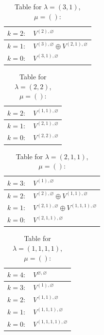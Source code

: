 \documentclass[a4paper,12pt]{article}
\begin{document}
\renewcommand{\arraystretch}{1.6} 
\begin{table}[H]
\centering
\caption{Table for $\lambda = (3, 1)$, $\mu = ()$:}
\begin{tabular}{|>{\centering\arraybackslash}p{15cm}|}
\hline
 $k = 2: \quad V^{(2), \varnothing} $ \\ \hline
 $k = 1: \quad V^{(3), \varnothing} \oplus V^{(2, 1), \varnothing} $ \\ \hline
 $k = 0: \quad V^{(3, 1), \varnothing} $ \\ \hline
\end{tabular}
\end{table}

\renewcommand{\arraystretch}{1.6} 
\begin{table}[H]
\centering
\caption{Table for $\lambda = (2, 2)$, $\mu = ()$:}
\begin{tabular}{|>{\centering\arraybackslash}p{15cm}|}
\hline
 $k = 2: \quad V^{(1, 1), \varnothing} $ \\ \hline
 $k = 1: \quad V^{(2, 1), \varnothing} $ \\ \hline
 $k = 0: \quad V^{(2, 2), \varnothing} $ \\ \hline
\end{tabular}
\end{table}

\renewcommand{\arraystretch}{1.6} 
\begin{table}[H]
\centering
\caption{Table for $\lambda = (2, 1, 1)$, $\mu = ()$:}
\begin{tabular}{|>{\centering\arraybackslash}p{15cm}|}
\hline
 $k = 3: \quad V^{(1), \varnothing} $ \\ \hline
 $k = 2: \quad V^{(2), \varnothing} \oplus V^{(1, 1), \varnothing} $ \\ \hline
 $k = 1: \quad V^{(2, 1), \varnothing} \oplus V^{(1, 1, 1), \varnothing} $ \\ \hline
 $k = 0: \quad V^{(2, 1, 1), \varnothing} $ \\ \hline
\end{tabular}
\end{table}

\renewcommand{\arraystretch}{1.6} 
\begin{table}[H]
\centering
\caption{Table for $\lambda = (1, 1, 1, 1)$, $\mu = ()$:}
\begin{tabular}{|>{\centering\arraybackslash}p{15cm}|}
\hline
 $k = 4: \quad V^{\varnothing, \varnothing} $ \\ \hline
 $k = 3: \quad V^{(1), \varnothing} $ \\ \hline
 $k = 2: \quad V^{(1, 1), \varnothing} $ \\ \hline
 $k = 1: \quad V^{(1, 1, 1), \varnothing} $ \\ \hline
 $k = 0: \quad V^{(1, 1, 1, 1), \varnothing} $ \\ \hline
\end{tabular}
\end{table}
\end{document}
